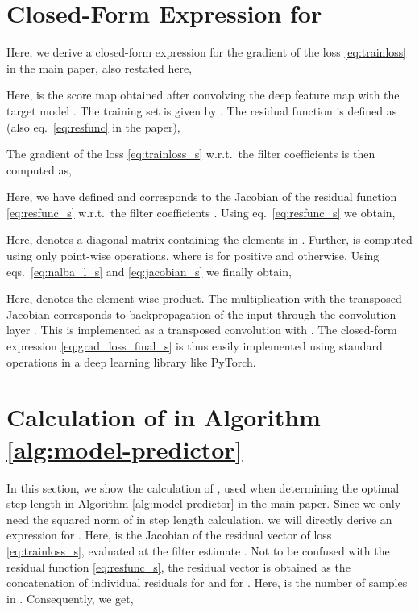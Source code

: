 \documentclass[10pt,twocolumn,letterpaper]{article}
\begin{document}
\section{Closed-Form Expression for }
\label{sec:grad_loss}

Here, we derive a closed-form expression for the gradient of the loss \eqref{eq:trainloss} in the main paper, also restated here,

Here,  is the score map obtained after convolving the deep feature map  with the target model . The training set is given by . The residual function  is defined as (also eq.~\eqref{eq:resfunc} in the paper),

The gradient  of the loss \eqref{eq:trainloss_s} w.r.t.\ the filter coefficients  is then computed as,

Here, we have defined  and  corresponds to the Jacobian of the residual function \eqref{eq:resfunc_s} w.r.t.\ the filter coefficients . Using eq.~\eqref{eq:resfunc_s} we obtain, 

Here,  denotes a diagonal matrix containing the elements in . Further,  is computed using only point-wise operations, where  is  for positive  and  otherwise. Using eqs.~\eqref{eq:nalba_l_s} and \eqref{eq:jacobian_s} we finally obtain,

Here,  denotes the element-wise product. The multiplication with the transposed Jacobian  corresponds to backpropagation of the input  through the convolution layer . This is implemented as a transposed convolution with . The closed-form expression \eqref{eq:grad_loss_final_s} is thus easily implemented using standard operations in a deep learning library like PyTorch.

\section{Calculation of  in Algorithm \ref{alg:model-predictor}}
\label{sec:h}

In this section, we show the calculation of , used when determining the optimal step length  in Algorithm \ref{alg:model-predictor} in the main paper. Since we only need the squared  norm of  in step length calculation, we will directly derive an expression for . Here,  is the Jacobian of the residual vector  of loss \eqref{eq:trainloss_s}, evaluated at the filter estimate . Not to be confused with the residual function \eqref{eq:resfunc_s}, the residual vector  is obtained as the concatenation of individual residuals  for  and  for . Here,  is the number of samples in . Consequently, we get,
 
\end{document}
